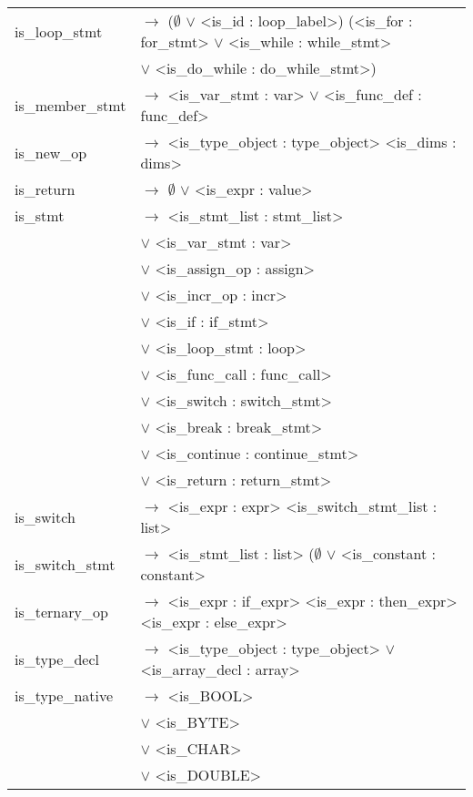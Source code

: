\documentclass[a4paper]{article}
\begin{document}
\begin{tabular}{ll}
	\begin{comment}
		- see is_stmt (repeated stmt_list)
	\end{comment}
	is\_loop\_stmt							& $\to$ ($\emptyset$ $\vee$ <is\_id : loop\_label>) (<is\_for : for\_stmt> $\vee$ <is\_while : while\_stmt> \\ 
											& $\vee$ <is\_do\_while : do\_while\_stmt>) \\
	is\_member\_stmt						& $\to$ <is\_var\_stmt : var> $\vee$ <is\_func\_def : func\_def> \\
	is\_new\_op								& $\to$ <is\_type\_object : type\_object> <is\_dims : dims> \\
	is\_return								& $\to$ $\emptyset$ $\vee$ <is\_expr : value> \\
	is\_stmt								& $\to$ <is\_stmt\_list : stmt\_list> \\
											& $\vee$ <is\_var\_stmt : var> \\
											& $\vee$ <is\_assign\_op : assign> \\
											& $\vee$ <is\_incr\_op : incr> \\
											& $\vee$ <is\_if : if\_stmt> \\
											& $\vee$ <is\_loop\_stmt : loop> \\
											& $\vee$ <is\_func\_call : func\_call> \\
											& $\vee$ <is\_switch : switch\_stmt> \\
											& $\vee$ <is\_break : break\_stmt> \\
											& $\vee$ <is\_continue : continue\_stmt> \\
											& $\vee$ <is\_return : return\_stmt> \\
	is\_switch								& $\to$ <is\_expr : expr> <is\_switch\_stmt\_list : list> \\
	is\_switch\_stmt						& $\to$ <is\_stmt\_list : list> ($\emptyset$ $\vee$ <is\_constant : constant> \\
	is\_ternary\_op							& $\to$ <is\_expr : if\_expr> <is\_expr : then\_expr> <is\_expr : else\_expr> \\
	is\_type\_decl							& $\to$ <is\_type\_object : type\_object> $\vee$ <is\_array\_decl : array> \\
	is\_type\_native						& $\to$ <is\_BOOL> \\
											& $\vee$ <is\_BYTE> \\
											& $\vee$ <is\_CHAR> \\
											& $\vee$ <is\_DOUBLE> \\

\end{tabular}
\end{document}
